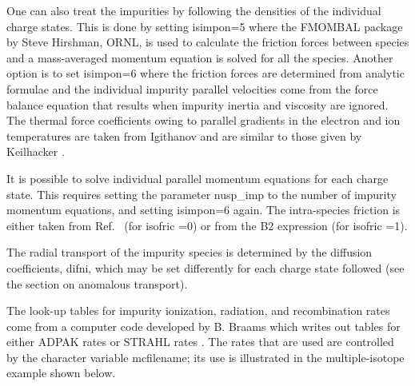 \documentclass [12pt]{article}
\begin{document}
One can also treat the impurities by following the densities of the individual
charge states.  This is done by setting {\sf isimpon=5} where the FMOMBAL
package by Steve Hirshman, ORNL, is used to calculate the friction forces
between species and a mass-averaged momentum equation is solved for all the
species.  Another option is to set {\sf isimpon=6} where the friction forces
are determined from analytic formulae and the individual impurity parallel
velocities come from the force balance equation that results when impurity
inertia and viscosity are ignored. The thermal force coefficients owing to
parallel gradients in the electron and ion temperatures are taken from
Igithanov \cite{igit88} and are similar to those given by Keilhacker
\cite{keil91}.

It is possible to solve individual parallel momentum equations for each charge
state.  This requires setting the parameter {\sf nusp\_imp} to the number of
impurity momentum equations, and setting {\sf isimpon=6} again.  The
intra-species friction is either taken from Ref.~ (for {\sf
  isofric =0}) or from the B2 expression \cite{braams87} (for {\sf isofric
  =1}).

The radial transport of the impurity species is determined by the diffusion
coefficients, {\sf difni}, which may be set differently for each charge state
followed (see the section on anomalous transport).

The look-up tables for impurity ionization, radiation, and recombination rates
come from a computer code developed by B. Braams which writes out tables for
either {\sf ADPAK} rates \cite{hulse83} or {\sf STRAHL} rates \cite{behr87}.
The rates that are used are controlled by the character variable {\sf
  mcfilename}; its use is illustrated in the multiple-isotope example shown
below.
\end{document}
